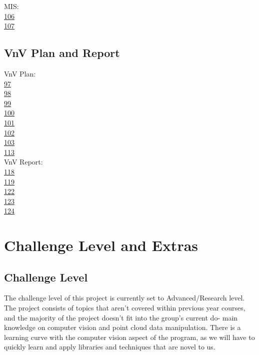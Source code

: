 \documentclass{article}
\begin{document}
MIS:\\
\href{https://github.com/takhtart/PCD/issues/106}{106}\\
\href{https://github.com/takhtart/PCD/issues/107}{107}\\

\subsection{VnV Plan and Report}

VnV Plan:\\
\href{https://github.com/takhtart/PCD/issues/97}{97}\\
\href{https://github.com/takhtart/PCD/issues/98}{98}\\
\href{https://github.com/takhtart/PCD/issues/99}{99}\\
\href{https://github.com/takhtart/PCD/issues/100}{100}\\
\href{https://github.com/takhtart/PCD/issues/101}{101}\\
\href{https://github.com/takhtart/PCD/issues/102}{102}\\
\href{https://github.com/takhtart/PCD/issues/103}{103}\\
\href{https://github.com/takhtart/PCD/issues/113}{113}\\

VnV Report:\\

\href{https://github.com/takhtart/PCD/issues/118}{118}\\
\href{https://github.com/takhtart/PCD/issues/119}{119}\\
\href{https://github.com/takhtart/PCD/issues/122}{122}\\
\href{https://github.com/takhtart/PCD/issues/123}{123}\\
\href{https://github.com/takhtart/PCD/issues/124}{124}\\

\section{Challenge Level and Extras}

\subsection{Challenge Level}

The challenge level of this project is currently set to Advanced/Research
level. The project consists of topics that aren’t covered within previous year
courses, and the majority of the project doesn’t fit into the group’s current do-
main knowledge on computer vision and point cloud data manipulation. There
is a learning curve with the computer vision aspect of the program, as we will
have to quickly learn and apply libraries and techniques that are novel to us.
\end{document}
